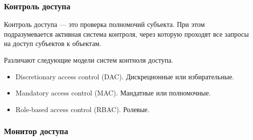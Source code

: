 \begin{frame}
\frametitle{Контроль доступа}
\begin{definition}%
\alert{Контроль доступа} --- это проверка полномочий субъекта. При этом подразумевается активная система контроля, через которую проходят все запросы на доступ субъектов к объектам.
\end{definition}
Различают следующие модели систем контноля доступа.
\begin{itemize}
    \item Discretionary access control (DAC). Дискреционные или избирательные.
    \item Mandatory access control (MAC). Мандатные или полномочные.
    \item Role-based access control (RBAC). Ролевые. 
\end{itemize}
\end{frame}


\begin{frame}
\frametitle{Монитор доступа}
\begin{figure}
    \begin{center}
    \end{center}
\end{figure} 
\end{frame}


